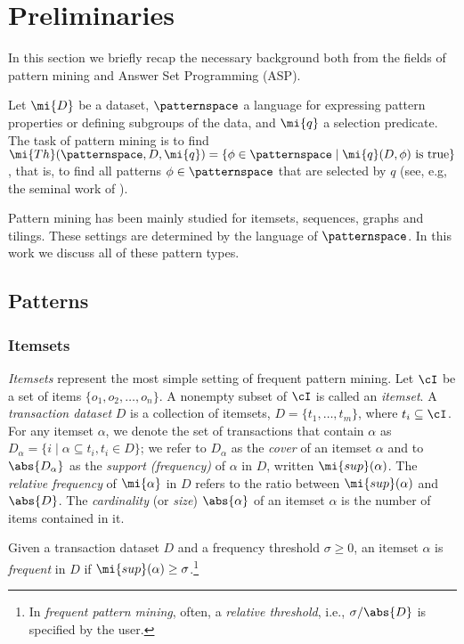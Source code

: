 \section{Preliminaries}\label{sec:prelim}
In this section we briefly recap the necessary background both from the fields of pattern mining and Answer Set Programming (ASP). 

Let $\mi{D}$ be a dataset, $\patternspace$ a language for expressing pattern properties or defining subgroups of the
data, and $\mi{q}$ a selection predicate. %
The task of pattern mining is to find $\mi{Th}(\patternspace,D, \mi{q})= \{\phi \in \patternspace \mid \mi{q}(D, \phi) \text{ is true}\}$, that is, to find all patterns $\phi\in\patternspace$ that are selected by $q$  (see, e.g, the seminal work of \textcite{DBLP:journals/datamine/MannilaT97}). 

Pattern mining has been mainly studied for %
itemsets, sequences, graphs and tilings. These settings are determined by the language of $\patternspace$. In this work we discuss all of these pattern types.

\subsection{Patterns} 
\subsubsection{Itemsets}
 \emph{Itemsets} represent the most simple setting of frequent pattern mining. Let $\cI$
be a set of items $\{o_1,o_2,\dotsc,o_n\}$. A nonempty subset of $\cI$ is called an \emph{itemset}. A
\emph{transaction dataset} $D$ is a collection of itemsets, $D = \{t_1 ,\dotsc, t_m \}$, where $t_i\subseteq \cI$.
For any itemset $\alpha$, we denote the set of transactions that contain $\alpha$ as $D_{\alpha}= \{i\mid\alpha \subseteq t_i, t_i \in D\}$; we refer to $D_{\alpha}$ as the \emph{cover} of an itemset $\alpha$ and to $\abs{D_{\alpha}}$ as the \emph{support (frequency)} of $\alpha$ in $D$, written $\mi{sup}(\alpha)$. The \emph{relative frequency} of $\mi{\alpha}$ in $D$ refers to the ratio between $\mi{sup}(\alpha)$ and $\abs{D}$. %
The \emph{cardinality} (or \emph{size}) $\abs{\alpha}$ of an itemset $\alpha$ is %
the number of items contained in it. %

\begin{definition}\label{def:frit} 
 Given a transaction dataset $D$ and a frequency threshold $\sigma \geq 0$, an itemset $\alpha$ is \emph{frequent} in $D$ if  $\mi{sup}(\alpha)\geq \sigma$.\footnote{In \emph{frequent pattern mining}, often, a \emph{relative threshold}, i.e., $\sigma/\abs{D}$ is specified by the user.}
\end{definition}

